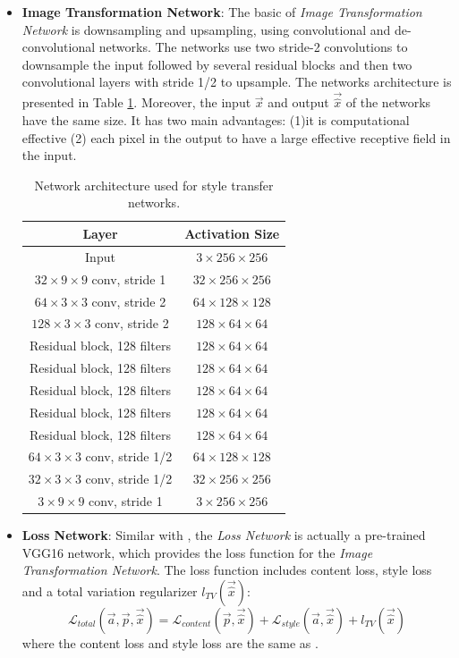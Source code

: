 \documentclass{article} %
\begin{document}
\begin{itemize}
\item \textbf{Image Transformation Network}: The basic of \emph{Image Transformation Network} is downsampling and upsampling, using convolutional and de-convolutional networks. The networks use two stride-2 convolutions to downsample the input followed by several residual blocks and then two convolutional layers with stride 1/2 to upsample. The networks architecture is presented in Table \ref{transform}. Moreover, the input $\vec{x}$ and output $\vec{\hat{x}}$ of the networks have the same size. It has two main advantages: (1)it is computational effective (2) each pixel in the output to have a large effective receptive field in the input.
\begin{table}[h]
\caption{Network architecture used for style transfer networks.}
\label{transform}
\centering
\begin{tabular}{|c|c|}

\hline
\textbf{Layer}&\textbf{Activation Size}\\
\hline
Input & $3\times256\times256$\\
$32\times9\times9$ conv, stride 1 & $32\times256\times256$\\
$64\times3\times3$ conv, stride 2&$64\times128\times128$\\
$128\times3\times3$ conv, stride 2& $128\times64\times64$\\
Residual block, 128 filters&$128\times64\times64$\\
Residual block, 128 filters&$128\times64\times64$\\
Residual block, 128 filters&$128\times64\times64$\\
Residual block, 128 filters&$128\times64\times64$\\
Residual block, 128 filters&$128\times64\times64$\\
$64\times3\times3$ conv, stride 1/2&$64\times128\times128$\\
$32\times3\times3$ conv, stride 1/2&$32\times256\times256$\\
$3\times9\times9$ conv, stride 1&$3\times256\times256$\\

\hline

\end{tabular}
\end{table}
\item \textbf{Loss Network}: Similar with \cite{1508.06576}, the \emph{Loss Network} is actually a pre-trained VGG16 network, which provides the loss function for the \emph{Image Transformation Network}. The loss function includes content loss, style loss and a total variation regularizer $l_{TV}(\vec{\hat{x}})$:
$$\mathcal{L}_{total}(\vec{a},\vec{p},\vec{\hat{x}})=\mathcal{L}_{content}(\vec{p}, \vec{\hat{x}}) + \mathcal{L}_{style}(\vec{a},\vec{\hat{x}}) + l_{TV}(\vec{\hat{x}})$$
where the content loss and style loss are the same as \cite{1508.06576}.
\end{itemize}
\end{document}
